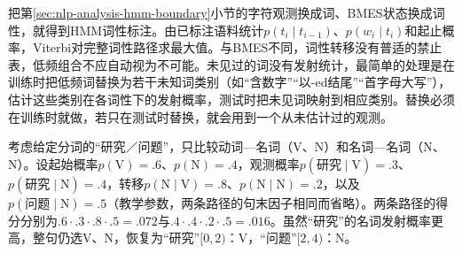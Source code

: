 把第\ref{sec:nlp-analysis-hmm-boundary}小节的字符观测换成词、BMES状态换成词性，就得到HMM词性标注。由已标注语料统计$p(t_i\mid t_{i-1})$、$p(w_i\mid t_i)$和起止概率，Viterbi对完整词性路径求最大值。与BMES不同，词性转移没有普适的禁止表，低频组合不应自动视为不可能。未见过的词没有发射统计，最简单的处理是在训练时把低频词替换为若干未知词类别（如“含数字”“以-ed结尾”“首字母大写”），估计这些类别在各词性下的发射概率，测试时把未见词映射到相应类别。替换必须在训练时就做，若只在测试时替换，就会用到一个从未估计过的观测。

考虑给定分词的“研究／问题”，只比较动词—名词（V、N）和名词—名词（N、N）。设起始概率$p(\mathrm V)=.6$、$p(\mathrm N)=.4$，观测概率$p(\text{研究}\mid\mathrm V)=.3$、$p(\text{研究}\mid\mathrm N)=.4$，转移$p(\mathrm N\mid\mathrm V)=.8$、$p(\mathrm N\mid\mathrm N)=.2$，以及$p(\text{问题}\mid\mathrm N)=.5$（教学参数，两条路径的句末因子相同而省略）。两条路径的得分分别为$.6\cdot.3\cdot.8\cdot.5=.072$与$.4\cdot.4\cdot.2\cdot.5=.016$。虽然“研究”的名词发射概率更高，整句仍选V、N，恢复为“研究”$[0,2)$：V，“问题”$[2,4)$：N。


